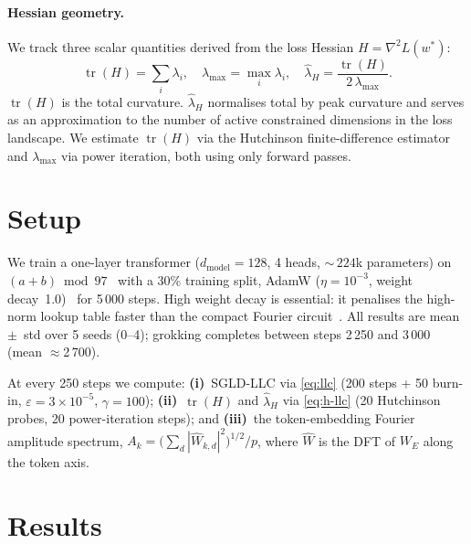 \documentclass{article}
\begin{document}
\paragraph{Hessian geometry.}
We track three scalar quantities derived from the loss Hessian $H = \nabla^2 L(w^*)$:
\begin{equation}
  \operatorname{tr}(H) = \textstyle\sum_i \lambda_i, \quad
  \lambda_{\max} = \max_i \lambda_i, \quad
  \hat\lambda_H = \frac{\operatorname{tr}(H)}{2\,\lambda_{\max}}.
  \label{eq:h-llc}
\end{equation}
$\operatorname{tr}(H)$ is the total curvature.
$\hat\lambda_H$ normalises total by peak curvature and serves as an
approximation to the number of active constrained dimensions in the loss
landscape.
We estimate $\operatorname{tr}(H)$ via the Hutchinson finite-difference
estimator~\citep{hutchinson1990stochastic} and $\lambda_{\max}$ via power
iteration, both using only forward passes.

\section{Setup}
\label{sec:setup}

We train a one-layer transformer ($d_\mathrm{model}=128$, 4 heads,
${\sim}\,224$k parameters) on $(a{+}b)\bmod 97$~\citep{power2022grokking}
with a 30\% training split, AdamW ($\eta=10^{-3}$, weight
decay~1.0)~\citep{kingma2015adam,loshchilov2019decoupled} for 5\,000 steps.
High weight decay is essential: it penalises the high-norm lookup table
faster than the compact Fourier circuit~\citep{varma2023explaining}.
All results are mean~$\pm$~std over 5 seeds (0--4);
grokking completes between steps 2\,250 and 3\,000 (mean $\approx$2\,700).

At every 250 steps we compute:
\textbf{(i)}~SGLD-LLC via \cref{eq:llc} (200 steps + 50 burn-in,
$\varepsilon=3\!\times\!10^{-5}$, $\gamma=100$);
\textbf{(ii)}~$\operatorname{tr}(H)$ and $\hat\lambda_H$ via \cref{eq:h-llc}
(20 Hutchinson probes, 20 power-iteration steps);
and \textbf{(iii)}~the token-embedding Fourier amplitude spectrum,
$A_k = \bigl(\sum_d|\hat{W}_{k,d}|^2\bigr)^{1/2}/p$,
where $\hat{W}$ is the DFT of $W_E$ along the token axis.

\section{Results}
\label{sec:results}
\end{document}
